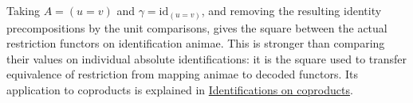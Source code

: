 \documentclass[11pt]{article}
\begin{document}
Taking $A=(u=v)$ and $\gamma=\mathrm{id}_{(u=v)}$, and removing the
resulting identity precompositions by the unit comparisons, gives the square
between the actual restriction functors on identification animae.
This is stronger than comparing their values on individual absolute
identifications: it is the square used to transfer equivalence of
restriction from mapping animae to decoded functors. Its application to
coproducts is explained in
\href{supplementary-identifications-on-coproducts.html}{Identifications on coproducts}.
\end{document}
